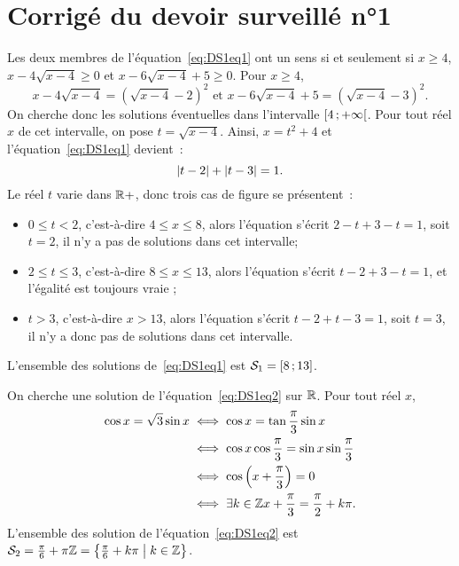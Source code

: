 \chapter{Corrigé du devoir surveillé n°1}
\begin{exercice}
    Les deux membres de l'équation~\eqref{eq:DS1eq1} ont un sens si et seulement si \(x \geq 4\), \(x-4\sqrt{x-4} \geq 0\) et \(x-6\sqrt{x-4}+5\geq 0\). Pour \(x \geq 4\),
    \[x - 4\sqrt{x-4} = (\sqrt{x-4}-2)^2 \text{~et~} x-6\sqrt{x-4}+5 = (\sqrt{x-4}-3)^2.\]
    On cherche donc les solutions éventuelles dans l'intervalle \(\left[ 4 \, ;  +\infty \right[\). Pour tout réel \(x\) de cet intervalle, on pose \(t = \sqrt{x-4}\). Ainsi, \(x = t^2+4\) et l'équation~\eqref{eq:DS1eq1} devient~:
    \[\left\lvert t-2\right\rvert + \left\lvert t-3\right\rvert = 1.\] Le réel \(t\) varie dans \(\mathbb{R}+\), donc trois cas de figure se présentent~:
    \begin{itemize}
        \item \(0 \leq t < 2\), c'est-à-dire \(4\leq x \leq 8\),  alors l'équation s'écrit \(2-t+3-t=1\), soit \(t=2\), il n'y a pas de solutions dans cet intervalle;
        \item \(2 \leq t \leq 3\), c'est-à-dire \(8\leq x \leq 13\), alors l'équation s'écrit \(t-2+3-t=1\), et l'égalité est toujours vraie ;
        \item \(t > 3\), c'est-à-dire \(x > 13\), alors l'équation s'écrit \(t-2+t-3=1\), soit \(t=3\), il n'y a donc pas de solutions dans cet intervalle.
    \end{itemize}
    L'ensemble des solutions de~\eqref{eq:DS1eq1} est \(\mathcal{S}_1 = \left[ 8 \, ;  13 \right]\).

    On cherche une solution de l'équation~\eqref{eq:DS1eq2} sur \(\mathbb{R}\). Pour tout réel \(x\),
    \begin{align*}
        \cos x = \sqrt{3}\sin x &\iff \cos x = \tan\frac{\pi}{3} \sin x \\
                                &\iff \cos x \cos \frac{\pi}{3} = \sin x \sin\frac{\pi}{3} \\
                                &\iff \cos\left(x+\frac{\pi}{3}\right) = 0 \\
                                &\iff \exists k \in \mathbb{Z} x +\frac{\pi}{3} = \frac{\pi}{2}+k\pi.
    \end{align*}
    L'ensemble des solution de l'équation~\eqref{eq:DS1eq2} est \(\mathcal{S}_2 = \frac{\pi}{6}+\pi\mathbb{Z} = \left\{\frac{\pi}{6}+k\pi\mathrel{}\middle|\mathrel{}k \in \mathbb{Z}\right\}\).


\end{exercice}

